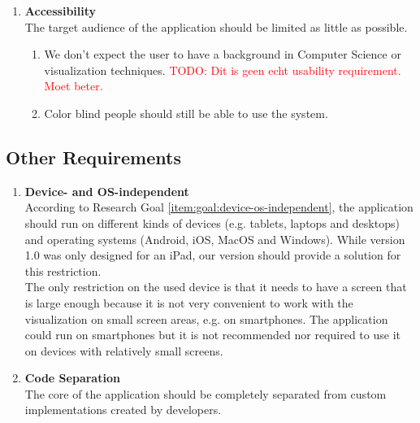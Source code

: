 \begin{enumerate}[label=\textbf{\arabic*}., ref=\arabic*]
	\item \textbf{Accessibility\label{item:accessibility}} \hfill \\
	The target audience of the application should be limited as little as possible. 
	\begin{enumerate}
		\item We don't expect the user to have a background in Computer Science or visualization techniques. \textcolor{red}{TODO: Dit is geen echt usability requirement. Moet beter.}
		\item Color blind people should still be able to use the system.
	\end{enumerate}
	
\end{enumerate}



\subsection{Other Requirements}\label{sec:other-requirements}

\begin{enumerate}[label=\textbf{\arabic*}., ref=\arabic*]
	\item \textbf{Device- and OS-independent\label{item:device-os-independent}} \hfill \\
	According to Research Goal \ref{item:goal:device-os-independent}, the application should run on different kinds of devices (e.g. tablets, laptops and desktops) and operating systems (Android, iOS, MacOS and Windows). While version 1.0 was only designed for an iPad, our version should provide a solution for this restriction.\\
	
	The only restriction on the used device is that it needs to have a screen that is large enough because it is not very convenient to work with the visualization on small screen areas, e.g. on smartphones. The application could run on smartphones but it is not recommended nor required to use it on devices with relatively small screens.
	
	\item \textbf{Code Separation\label{item:code-separation}} \hfill \\
	The core of the application should be completely separated from custom implementations created by developers.

\end{enumerate}



